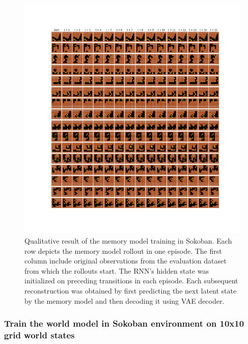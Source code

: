 \begin{figure}[H]
\includegraphics[width=1\textwidth,keepaspectratio]{figures/Sokoban_memory.png}
\caption[Qualitative result of the memory model training in Sokoban]{Qualitative result of the memory model training in Sokoban. Each row depicts the memory model rollout in one episode. The first column include original observations from the evaluation dataset from which the rollouts start. The RNN's hidden state was initialized on preceding transitions in each episode. Each subsequent reconstruction was obtained by first predicting the next latent state by the memory model and then decoding it using VAE decoder.}
\label{Fig.Sokoban_memory}
\end{figure}

\subsubsection{Train the world model in Sokoban environment on 10x10 grid world states}

